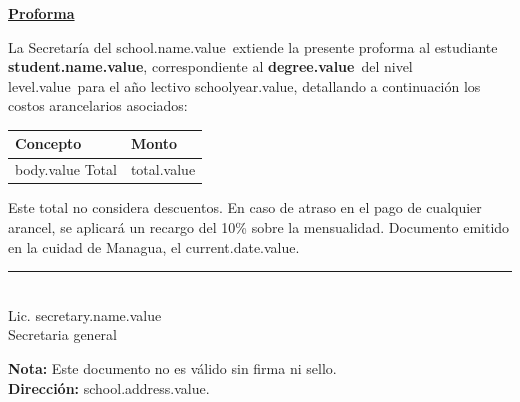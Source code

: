 \documentclass[12pt]{article}
\newcommand{\degreeName}{degree.value}
\newcommand{\levelName}{level.value}
\newcommand{\studentName}{student.name.value}
\newcommand{\schoolYear}{schoolyear.value}
\newcommand{\currentDate}{current.date.value}
\newcommand{\totalAmount}{total.value}
\newcommand{\secretaryName}{secretary.name.value}
\newcommand{\schoolName}{school.name.value}
\newcommand{\schoolAddress}{school.address.value}
\begin{document}
    \begin{center}
        \underline{\textbf{\Large Proforma}}
    \end{center}
    La Secretaría del \schoolName\ extiende la presente proforma al estudiante \textbf{\studentName},
    correspondiente al \textbf{\degreeName}~del nivel \levelName~para el año lectivo \schoolYear, detallando a continuación
    los costos arancelarios asociados:
    \begin{table}[H]
        \centering
        \begin{tabular}{l|l}
            \hline
            Concepto & Monto\\\hline
            body.value \hline
            Total & \totalAmount
        \end{tabular}
    \end{table}
    Este total no considera descuentos.
    En caso de atraso en el pago de cualquier arancel, se aplicará un recargo del 10\% sobre la mensualidad.
    Documento emitido en la cuidad de Managua, el \currentDate.

    \vfill
    \begin{center}
        \rule{5cm}{0.4pt}\\[1mm]
        Lic. \secretaryName\\
        Secretaria general
    \end{center}
    \vfill
    \textbf{Nota:} Este documento no es válido sin firma ni sello.\\
    \textbf{Dirección:} \schoolAddress.
\end{document}

